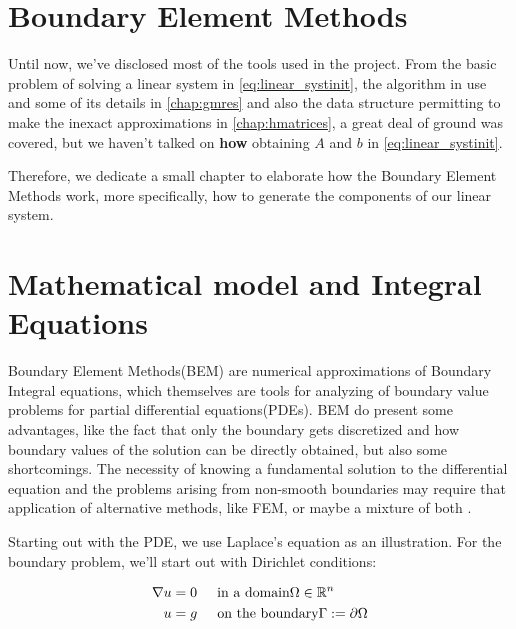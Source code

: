 \section{Boundary Element Methods}

Until now, we've disclosed most of the tools used in the project. From the basic problem of solving a linear system in \ref{eq:linear_systinit}, the algorithm in use and some of its details in \autoref{chap:gmres} and also the data structure permitting to make the inexact approximations in \autoref{chap:hmatrices}, a great deal of ground was covered, but we haven't talked on \textbf{how} obtaining $A$ and $b$ in \ref{eq:linear_systinit}.

Therefore, we dedicate a small chapter to elaborate how the Boundary Element Methods work, more specifically, how to generate the components of our linear system.

\section{Mathematical model and Integral Equations}

Boundary Element Methods(BEM) are numerical approximations of Boundary Integral equations, which themselves are tools for analyzing of boundary value problems for partial differential equations(PDEs). BEM do present some advantages, like the fact that only the boundary gets discretized and how boundary values of the solution can be directly obtained, but also some shortcomings. The necessity of knowing a fundamental solution to the differential equation and the problems arising from non-smooth boundaries may require that application of alternative methods, like FEM, or maybe a mixture of both \cite{costabel1987principles}.

Starting out with the PDE, we use Laplace's equation as an illustration. For the boundary problem, we'll start out with Dirichlet conditions:



\begin{align}\label{eq:pde_model}
    \begin{split}
        \nabla u &= 0 \hspace{0.2in} \text{in a domain} \Omega \in \mathbb{R}^{n}\\
        u &= g \hspace{0.2in} \text{on the boundary} \Gamma := \partial \Omega
    \end{split}
\end{align}

